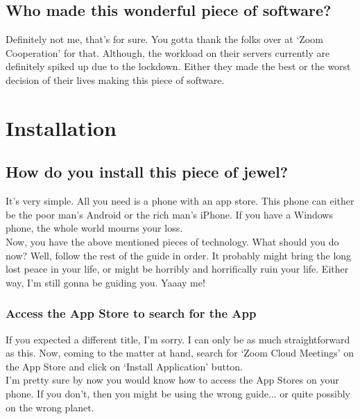 \documentclass[14pt]{report}
\begin{document}
        \section{Who made this wonderful piece of software?}
            Definitely not me, that's for sure. You gotta thank the folks over at `Zoom Cooperation' for that. Although, the workload on their servers currently are definitely spiked up due to the lockdown. Either they made the best or the worst decision of their lives making this piece of software.   
        
    \newpage

    


	\chapter{Installation}\label{chapter2}
		
            \section{How do you install this piece of jewel?}
                It's very simple. All you need is a phone with an app store. This phone can either be the poor man's Android or the rich man's iPhone. If you have a Windows phone, the whole world mourns your loss.\\

                Now, you have the above mentioned pieces of technology. What should you do now? Well, follow the rest of the guide in order. It probably might bring the long lost peace in your life, or might be horribly and horrifically ruin your life. Either way, I'm still gonna be guiding you. Yaaay me!

                \subsection{Access the App Store to search for the App}
                    If you expected a different title, I'm sorry. I can only be as much straightforward as this. Now, coming to the matter at hand, search for `Zoom Cloud Meetings' on the App Store and click on `Install Application' button.\\

                    I'm pretty sure by now you would know how to access the App Stores on your phone. If you don't, then you might be using the wrong guide... or quite possibly on the wrong planet.\\
\end{document}

